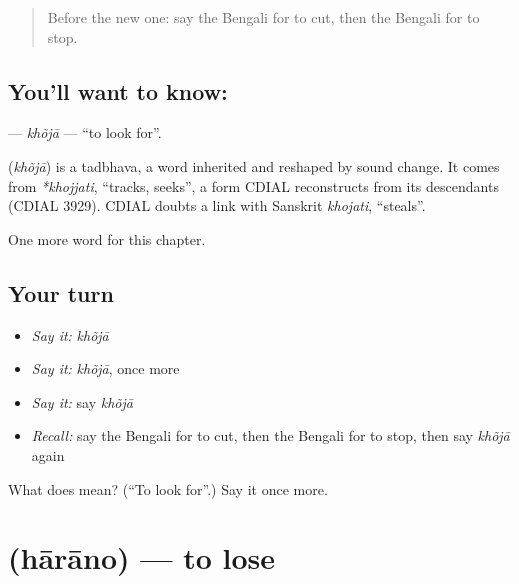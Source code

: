 \label{lesson:BN-C52-khoja}



\begin{quote}
Before the new one: say the Bengali for to cut, then the Bengali for to stop.
\end{quote}

\subsection*{You'll want to know: }
\textbf{} — \emph{khõjā} — \textquotedblleft{}to look for\textquotedblright{}.

\begin{cousinweb}
\textbf{} (\emph{khõjā}) is a tadbhava, a word inherited and reshaped by sound change. It comes from \emph{*khojjati}, \textquotedblleft{}tracks, seeks\textquotedblright{}, a form CDIAL reconstructs from its descendants (CDIAL 3929). CDIAL doubts a link with Sanskrit \emph{khojati}, \textquotedblleft{}steals\textquotedblright{}.
\end{cousinweb}

\begin{grammarlens}[title={What you've built}]
One more word for this chapter.
\end{grammarlens}

\subsection*{Your turn}
\begin{itemize}
\raggedright
  \item \emph{Say it:} \emph{khõjā}
  \item \emph{Say it:} \emph{khõjā}, once more
  \item \emph{Say it:} say \emph{khõjā}
  \item \emph{Recall:} say the Bengali for to cut, then the Bengali for to stop, then say \emph{khõjā} again
\end{itemize}

\begin{tcolorbox}[breakable,colback=teal!4,colframe=teal!35!black,title={Before you move on}]
What does  mean? (\textquotedblleft{}To look for\textquotedblright{}.) Say it once more.
\end{tcolorbox}
\section[\texorpdfstring{\bn{হারানো} (hārāno)}{হারানো (hārāno)}]{ (hārāno) — to lose}

